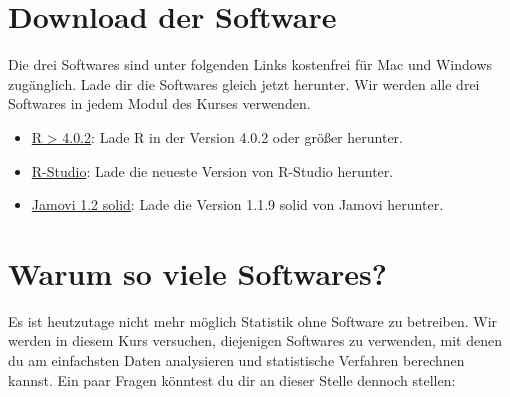 \documentclass[
]{book}
\providecommand{\tightlist}{%
  \setlength{\itemsep}{0pt}\setlength{\parskip}{0pt}}
\begin{document}
\hypertarget{download-der-software}{%
\section{Download der Software}\label{download-der-software}}

Die drei Softwares sind unter folgenden Links kostenfrei für Mac und Windows zugänglich. Lade dir die Softwares gleich jetzt herunter. Wir werden alle drei Softwares in jedem Modul des Kurses verwenden.

\begin{itemize}
\tightlist
\item
  \href{https://ftp.gwdg.de/pub/misc/cran/}{R \textgreater{} 4.0.2}: Lade R in der Version 4.0.2 oder größer herunter.
\item
  \href{https://rstudio.com/products/rstudio/download/}{R-Studio}: Lade die neueste Version von R-Studio herunter.
\item
  \href{https://www.jamovi.org/download.html}{Jamovi 1.2 solid}: Lade die Version 1.1.9 solid von Jamovi herunter.
\end{itemize}

\hypertarget{warum-so-viele-softwares}{%
\section{Warum so viele Softwares?}\label{warum-so-viele-softwares}}

Es ist heutzutage nicht mehr möglich Statistik ohne Software zu betreiben. Wir werden in diesem Kurs versuchen, diejenigen Softwares zu verwenden, mit denen du am einfachsten Daten analysieren und statistische Verfahren berechnen kannst. Ein paar Fragen könntest du dir an dieser Stelle dennoch stellen:
\end{document}
